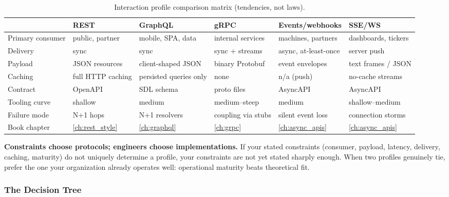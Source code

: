 \begin{table}[htbp]
  \centering
  \small
  \begin{tabularx}{\textwidth}{l X X X X X}
    \toprule
    & \textbf{REST} & \textbf{GraphQL} & \textbf{gRPC} & \textbf{Events/webhooks} & \textbf{SSE/WS} \\
    \midrule
    Primary consumer &
      public, partner &
      mobile, SPA, data &
      internal services &
      machines, partners &
      dashboards, tickers \\
    Delivery &
      sync & sync & sync + streams & async, at-least-once & server push \\
    Payload &
      JSON resources \cite{rfc8259} &
      client-shaped JSON &
      binary Protobuf \cite{protobufdocs} &
      event envelopes &
      text frames / JSON \\
    Caching &
      full HTTP caching \cite{rfc9110} &
      persisted queries only &
      none &
      n/a (push) &
      no-cache streams \\
    Contract &
      OpenAPI \cite{openapi31} &
      SDL schema \cite{graphqlspec} &
      proto files \cite{grpcdocs} &
      AsyncAPI \cite{asyncapi} &
      AsyncAPI \\
    Tooling curve &
      shallow & medium & medium--steep & medium & shallow--medium \\
    Failure mode &
      N+1 hops & N+1 resolvers & coupling via stubs &
      silent event loss & connection storms \\
    Book chapter &
      \ref{ch:rest_style} & \ref{ch:graphql} & \ref{ch:grpc} &
      \ref{ch:async_apis} & \ref{ch:async_apis} \\
    \bottomrule
  \end{tabularx}
  \caption{Interaction profile comparison matrix (tendencies, not laws).}
  \label{tab:protocol-matrix}
\end{table}

\begin{keyconceptbox}
\textbf{Constraints choose protocols; engineers choose implementations.}
If your stated constraints (consumer, payload, latency, delivery, caching,
maturity) do not uniquely determine a profile, your constraints are not yet
stated sharply enough. When two profiles genuinely tie, prefer the one your
organization already operates well: operational maturity beats theoretical
fit.
\end{keyconceptbox}

\subsubsection{The Decision Tree}

